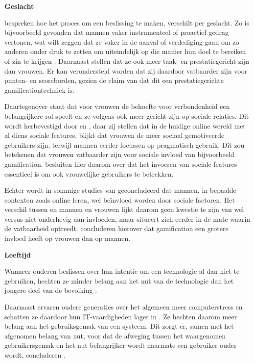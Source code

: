 \textbf{Geslacht}

\textcite{Venkatesh2000} bespreken hoe het proces om een beslissing te maken, verschilt per geslacht. Zo is bijvoorbeeld gevonden dat mannen vaker instrumenteel of proactief gedrag vertonen, wat wilt zeggen dat ze vaker in de aanval of verdediging gaan om zo anderen onder druk te zetten om uiteindelijk op die manier hun doel te bereiken of zin te krijgen \autocite{Spence1980}. Daarnaast stellen \textcite{Hoffman1972, Minton1980} dat ze ook meer taak- en prestatiegericht zijn dan vrouwen.
Er kan verondersteld worden dat zij daardoor vatbaarder zijn voor punten- en scoreborden, gezien de claim van \textcite{Hamari2014} dat dit een prestatiegerichte gamificationtechniek is.

Daartegenover staat dat voor vrouwen de behoefte voor verbondenheid een belangrijkere rol speelt \autocite{Hoffman1972} en ze volgens \textcite{Minton1980, Spence1980} ook meer gericht zijn op sociale relaties. Dit wordt herbevestigd door \textcite{Haferkamp2012} en \textcite{Muscanell2012}, daar zij stellen dat in de huidige online wereld met al diens sociale features, blijkt dat vrouwen de meer sociaal gemotiveerde gebruikers zijn, terwijl mannen eerder focussen op pragmatisch gebruik. Dit zou betekenen dat vrouwen vatbaarder zijn voor sociale invloed van bijvoorbeeld gamification. \textcite{Koivisto2014} besluiten hier daarom over dat het invoeren van sociale features essentieel is om ook vrouwelijke gebruikers te betrekken.

Echter wordt in sommige studies van \textcite{Wang2008} geconcludeerd dat mannen, in bepaalde contexten zoals online leren, wel beïnvloed worden door sociale factoren. Het verschil tussen en mannen en vrouwen lijkt daarom geen kwestie te zijn van wel versus niet onderhevig aan invloeden, maar situeert zich eerder in de mate waarin de vatbaarheid optreedt. \textcite{PoloPena2020} concluderen hierover dat gamification een grotere invloed heeft op vrouwen dan op mannen.

\textbf{Leeftijd}

Wanneer ouderen beslissen over hun intentie om een technologie al dan niet te gebruiken, hechten ze minder belang aan het nut van de technologie dan het jongere deel van de bevolking \autocite{Venkatesh2003}.

Daarnaast ervaren oudere generaties over het algemeen meer computerstress en schatten ze daardoor hun IT-vaardigheden lager in \autocite{Chung2010}. Ze hechten daarom meer belang aan het gebruiksgemak van een systeem. Dit zorgt er, samen met het afgenomen belang van nut, voor dat de afweging tussen het waargenomen gebruikersgemak en het nut belangrijker wordt naarmate een gebruiker ouder wordt, concluderen \textcite{Melenhorst2001}.

